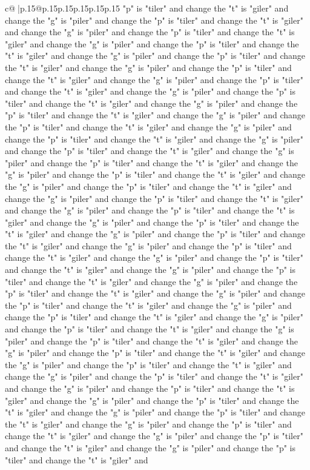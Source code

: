 \documentclass{article}
\begin{document}
{\begin{supertabular}{c@{$\;$}|p{.15\linewidth}@{}p{.15\linewidth}p{.15\linewidth}p{.15\linewidth}p{.15\linewidth}p{.15\linewidth}}
{{{"p" is "tiler" and change the "t" is "giler" and change the "g" is "piler" and change the "p" is "tiler" and change the "t" is "giler" and change the "g" is "piler" and change the "p" is "tiler" and change the "t" is "giler" and change the "g" is "piler" and change the "p" is "tiler" and change the "t" is "giler" and change the "g" is "piler" and change the "p" is "tiler" and change the "t" is "giler" and change the "g" is "piler" and change the "p" is "tiler" and change the "t" is "giler" and change the "g" is "piler" and change the "p" is "tiler" and change the "t" is "giler" and change the "g" is "piler" and change the "p" is "tiler" and change the "t" is "giler" and change the "g" is "piler" and change the "p" is "tiler" and change the "t" is "giler" and change the "g" is "piler" and change the "p" is "tiler" and change the "t" is "giler" and change the "g" is "piler" and change the "p" is "tiler" and change the "t" is "giler" and change the "g" is "piler" and change the "p" is "tiler" and change the "t" is "giler" and change the "g" is "piler" and change the "p" is "tiler" and change the "t" is "giler" and change the "g" is "piler" and change the "p" is "tiler" and change the "t" is "giler" and change the "g" is "piler" and change the "p" is "tiler" and change the "t" is "giler" and change the "g" is "piler" and change the "p" is "tiler" and change the "t" is "giler" and change the "g" is "piler" and change the "p" is "tiler" and change the "t" is "giler" and change the "g" is "piler" and change the "p" is "tiler" and change the "t" is "giler" and change the "g" is "piler" and change the "p" is "tiler" and change the "t" is "giler" and change the "g" is "piler" and change the "p" is "tiler" and change the "t" is "giler" and change the "g" is "piler" and change the "p" is "tiler" and change the "t" is "giler" and change the "g" is "piler" and change the "p" is "tiler" and change the "t" is "giler" and change the "g" is "piler" and change the "p" is "tiler" and change the "t" is "giler" and change the "g" is "piler" and change the "p" is "tiler" and change the "t" is "giler" and change the "g" is "piler" and change the "p" is "tiler" and change the "t" is "giler" and change the "g" is "piler" and change the "p" is "tiler" and change the "t" is "giler" and change the "g" is "piler" and change the "p" is "tiler" and change the "t" is "giler" and change the "g" is "piler" and change the "p" is "tiler" and change the "t" is "giler" and change the "g" is "piler" and change the "p" is "tiler" and change the "t" is "giler" and change the "g" is "piler" and change the "p" is "tiler" and change the "t" is "giler" and change the "g" is "piler" and change the "p" is "tiler" and change the "t" is "giler" and change the "g" is "piler" and change the "p" is "tiler" and change the "t" is "giler" and change the "g" is "piler" and change the "p" is "tiler" and change the "t" is "giler" and change the "g" is "piler" and change the "p" is "tiler" and change the "t" is "giler" and change the "g" is "piler" and change the "p" is "tiler" and change the "t" is "giler" and change the "g" is "piler" and change the "p" is "tiler" and change the "t" is "giler" and }}}
\end{supertabular}}
\end{document}

